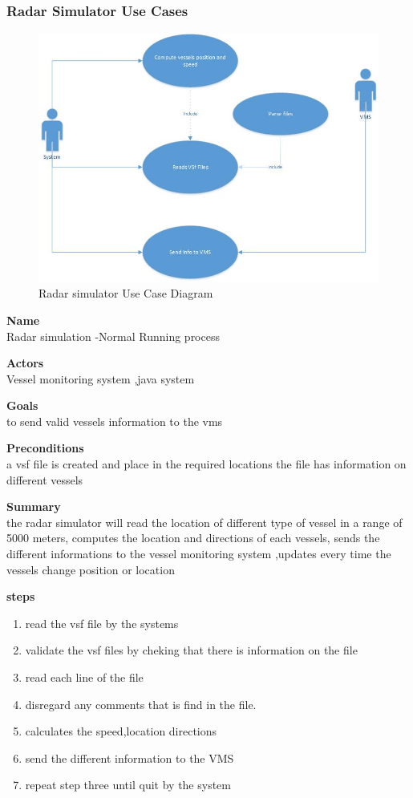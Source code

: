 \subsubsection{ Radar Simulator Use Cases}
\begin{figure}[h]
\caption{Radar simulator Use Case Diagram}
\includegraphics[width=\linewidth]{usecasediagram}
\end{figure}

\noindent
{\bf Name}\\
Radar simulation -Normal Running process

\noindent
{\bf Actors}\\
Vessel monitoring system ,java system

\noindent
{\bf Goals}\\
to send valid vessels information to the vms 

\noindent
{\bf Preconditions }\\
a vsf  file is created and place in the required locations 
the file has information on different vessels

\noindent
{\bf Summary }\\
the radar simulator will read the location of different type of vessel in a range of 5000 meters,
computes the location and directions of each vessels, 
sends the different informations to the vessel monitoring system ,updates every time the vessels  
change position or location

\noindent
{\bf steps }\\ 
\begin{enumerate}
\item  read  the vsf file  by the systems 
\item validate the vsf files by cheking that there is information on the file 
\item read each line of the file 
\item disregard any comments that is find in the file.
\item calculates the speed,location directions
\item send the different information to the VMS
\item repeat step three until quit by the system
\end{enumerate} 

